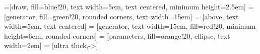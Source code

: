 
% 


=[draw, fill=blue!20, text width=5em, 
    text centered, minimum height=2.5em]
=[generator, fill=green!20, rounded corners, text width=15em]
 = [above, text width=5em, text centered]
 = [generator, text width=15em, fill=red!20, 
    minimum height=6em, rounded corners]
 = [parameters, fill=orange!20, ellipse, text width=2em]
 = [ultra thick,->]

\def\blockdist{2}
\def\edgedist{2.5}


